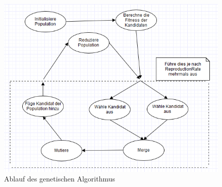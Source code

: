 \documentclass[12pt,a4paper]{scrartcl}
\begin{document}
\begin{figure}[H]
\centering
\includegraphics[width=.75\textwidth]{images/GA_FlowChart}
\caption{Ablauf des genetischen Algorithmus}
\label{fig:ga_flow}
\end{figure}
\end{document}
